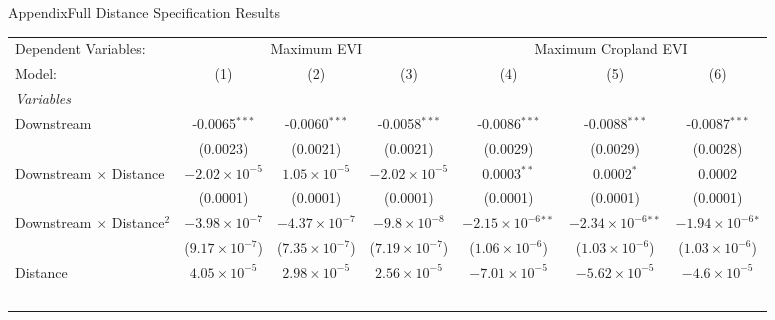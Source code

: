 \documentclass[aspectratio=169,11pt,dvipsnames, handout]{beamer}
\begin{document}
\begin{frame}{\textcolor{defaultclr!30}{Appendix}\hspace{0.75em}Full Distance Specification Results}
\label{frame:distfull}
 \centering

\begin{adjustbox}{width = 0.6\textwidth, center}
   \begin{tabular}{lcccccc}\label{tab:app_main_dist_squared}
      \tabularnewline \midrule \midrule
      Dependent Variables: & \multicolumn{3}{c}{Maximum EVI} & \multicolumn{3}{c}{Maximum Cropland EVI}\\
      Model:                            & (1)                     & (2)                     & (3)                            & (4)                           & (5)                           & (6)\\  
      \midrule
      \emph{Variables}\\
      Downstream                        & -0.0065$^{***}$         & -0.0060$^{***}$         & -0.0058$^{***}$                & -0.0086$^{***}$               & -0.0088$^{***}$               & -0.0087$^{***}$\\   
                                        & (0.0023)                & (0.0021)                & (0.0021)                       & (0.0029)                      & (0.0029)                      & (0.0028)\\   
      Downstream $\times$ Distance      & $-2.02\times 10^{-5}$   & $1.05\times 10^{-5}$    & $-2.02\times 10^{-5}$          & 0.0003$^{**}$                 & 0.0002$^{*}$                  & 0.0002\\   
                                        & (0.0001)                & (0.0001)                & (0.0001)                       & (0.0001)                      & (0.0001)                      & (0.0001)\\   
      Downstream $\times$ Distance$^2$  & $-3.98\times 10^{-7}$   & $-4.37\times 10^{-7}$   & $-9.8\times 10^{-8}$           & $-2.15\times 10^{-6}$$^{**}$  & $-2.34\times 10^{-6}$$^{**}$  & $-1.94\times 10^{-6}$$^{*}$\\    
                                        & ($9.17\times 10^{-7}$)  & ($7.35\times 10^{-7}$)  & ($7.19\times 10^{-7}$)         & ($1.06\times 10^{-6}$)        & ($1.03\times 10^{-6}$)        & ($1.03\times 10^{-6}$)\\    
      Distance                          & $4.05\times 10^{-5}$    & $2.98\times 10^{-5}$    & $2.56\times 10^{-5}$           & $-7.01\times 10^{-5}$         & $-5.62\times 10^{-5}$         & $-4.6\times 10^{-5}$\\    
$$
\end{tabular}
\end{adjustbox}
\end{frame}
\end{document}
